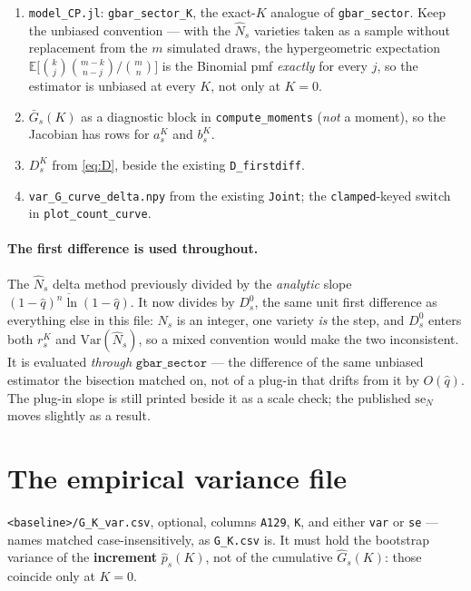 \documentclass[11pt]{article}
\newcommand{\Gbar}{\bar{G}}
\newcommand{\Ghat}{\hat{G}}
\newcommand{\Nhat}{\hat{N}}
\newcommand{\qhat}{\hat{q}}
\begin{document}
\begin{enumerate}
\item \texttt{model\_CP.jl}: \texttt{gbar\_sector\_K}, the exact-$K$ analogue of
\texttt{gbar\_sector}. Keep the unbiased convention --- with the $\Nhat_s$ varieties taken as
a sample without replacement from the $m$ simulated draws, the hypergeometric expectation
$\mathbb{E}\big[\binom{k}{j}\binom{m-k}{n-j}/\binom{m}{n}\big]$ is the Binomial pmf
\emph{exactly} for every $j$, so the estimator is unbiased at every $K$, not only at $K=0$.
\item $\Gbar_s(K)$ as a diagnostic block in \texttt{compute\_moments} (\emph{not} a moment),
so the Jacobian has rows for $a_s^{K}$ and $b_s^{K}$.
\item $D_s^{K}$ from \eqref{eq:D}, beside the existing \texttt{D\_firstdiff}.
\item \texttt{var\_G\_curve\_delta.npy} from the existing \texttt{Joint}; the
\texttt{clamped}-keyed switch in \texttt{plot\_count\_curve}.
\end{enumerate}

\paragraph{The first difference is used throughout.}
The $\Nhat_s$ delta method previously divided by the \emph{analytic} slope
$\overline{(1-\qhat)^{n}\ln(1-\qhat)}$. It now divides by $D_s^{0}$, the same unit first
difference as everything else in this file: $N_s$ is an integer, one variety \emph{is} the
step, and $D_s^{0}$ enters both $r_s^{K}$ and $\mathrm{Var}(\Nhat_s)$, so a mixed convention
would make the two inconsistent. It is evaluated \emph{through} $\mathtt{gbar\_sector}$ ---
the difference of the same unbiased estimator the bisection matched on, not of a plug-in that
drifts from it by $O(\qhat)$. The plug-in slope is still printed beside it as a scale check;
the published $\mathrm{se}_N$ moves slightly as a result.

\section{The empirical variance file}

\texttt{<baseline>/G\_K\_var.csv}, optional, columns \texttt{A129}, \texttt{K}, and either
\texttt{var} or \texttt{se} --- names matched case-insensitively, as \texttt{G\_K.csv} is.
It must hold the bootstrap variance of the \textbf{increment} $\hat p_s(K)$, not of the
cumulative $\Ghat_s(K)$: those coincide only at $K=0$.
\end{document}
